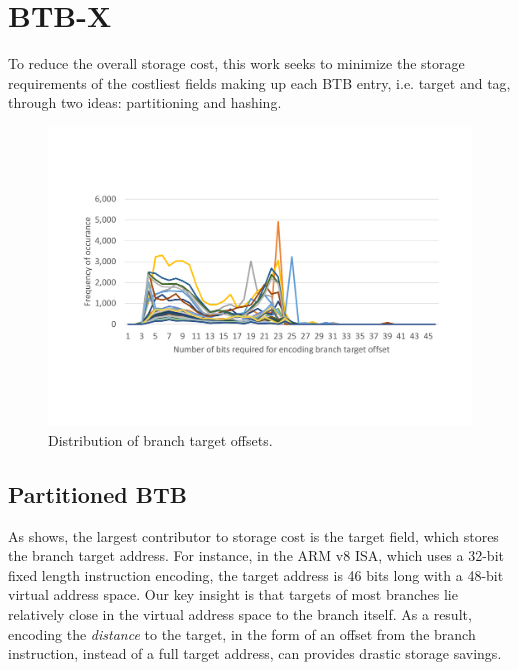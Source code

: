 \section{BTB-X}
\label{cal:sec:design}


To reduce the overall storage cost, this work seeks to minimize the storage requirements of the costliest fields making up each BTB entry, i.e. target and tag, through two ideas: partitioning and hashing. 

\begin{figure}
    \centering
    \includegraphics[width=\columnwidth, trim=60 140 60 155, clip]{figures/OffsetLen1.pdf}
    \caption{Distribution of branch target offsets.}
    \vspace{-0.1in}
    \label{cal:fig:offsets}
\end{figure}

\subsection{Partitioned BTB}

As  shows, the largest contributor to storage cost is the target field, which stores the branch target address. For instance, in the ARM v8 ISA, which uses a 32-bit fixed length instruction encoding, the target address is 46 bits long with a 48-bit virtual address space. Our key insight is that targets of most branches lie relatively close in the virtual address space to the branch itself. As a result, encoding the {\em distance} to the target, in the form of an offset from the branch instruction, instead of a full target address, can provides drastic storage savings. 

